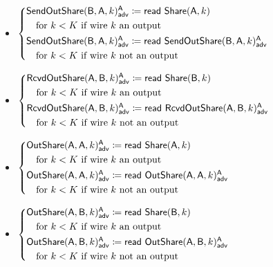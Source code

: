 \begin{itemize}
\item {\color{blue} $\begin{cases*} \LeakSendOutShare(\B,\A,k)^\A_\adv \coloneqq \read{\Share(\A,k)} \\ \hspace{10pt} \text{for $k < K$ if wire $k$ an output} \\ \LeakSendOutShare(\B,\A,k)^\A_\adv \coloneqq \read{\LeakSendOutShare(\B,\A,k)^\A_\adv} \\ \hspace{10pt} \text{for $k < K$ if wire $k$ not an output} \end{cases*}$}
\item {\color{blue} $\begin{cases*} \LeakRcvdOutShare(\A,\B,k)^\A_\adv \coloneqq \read{\Share(\B,k)} \\ \hspace{10pt} \text{for $k < K$ if wire $k$ an output} \\ \LeakRcvdOutShare(\A,\B,k)^\A_\adv \coloneqq \read{\LeakRcvdOutShare(\A,\B,k)^\A_\adv} \\ \hspace{10pt} \text{for $k < K$ if wire $k$ not an output} \end{cases*}$}
\item {\color{blue} $\begin{cases*} \LeakOutShare(\A,\A,k)^\A_\adv \coloneqq \read{\Share(\A,k)} \\ \hspace{10pt} \text{for $k < K$ if wire $k$ an output} \\ \LeakOutShare(\A,\A,k)^\A_\adv \coloneqq \read{\LeakOutShare(\A,\A,k)^\A_\adv} \\ \hspace{10pt} \text{for $k < K$ if wire $k$ not an output} \end{cases*}$}
\item {\color{blue} $\begin{cases*} \LeakOutShare(\A,\B,k)^\A_\adv \coloneqq \read{\Share(\B,k)} \\ \hspace{10pt} \text{for $k < K$ if wire $k$ an output} \\ \LeakOutShare(\A,\B,k)^\A_\adv \coloneqq \read{\LeakOutShare(\A,\B,k)^\A_\adv} \\ \hspace{10pt} \text{for $k < K$ if wire $k$ not an output} \end{cases*}$}

\end{itemize}

